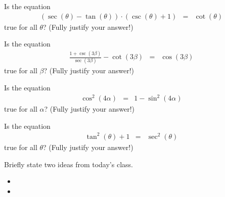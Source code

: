 \begin{problem}
\item Is the equation
  \begin{eqnarray*}
    \left( \sec(\theta) - \tan(\theta) \right) \cdot \left(\csc(\theta)+1\right) 
    & = & 
    \cot(\theta)
  \end{eqnarray*}
  true for all $\theta$? (Fully justify your answer!)

  \vfill

  \clearpage

\item Is the equation
  \begin{eqnarray*}
    \frac{1+\csc(3\beta)}{\sec(3\beta)} - \cot(3\beta) & = & \cos(3\beta)
  \end{eqnarray*}
  true for all $\beta$? (Fully justify your answer!)

  \vfill

  \clearpage

\item Is the equation
  \begin{eqnarray*}
    \cos^2(4\alpha) & = & 1 - \sin^2(4\alpha)
  \end{eqnarray*}
  true for all $\alpha$? (Fully justify your answer!)

  \vfill

  \clearpage

\item Is the equation
  \begin{eqnarray*}
    \tan^2(\theta) + 1 & = & \sec^2(\theta)
  \end{eqnarray*}
  true for all $\theta$? (Fully justify your answer!)

  \vfill

  \clearpage

\end{problem}

\postClass

\begin{problem}
\item Briefly state two ideas from today's class.
  \begin{itemize}
  \item 
  \item 
  \end{itemize}
\item 
  \begin{subproblem}
    \item
  \end{subproblem}
\end{problem}



